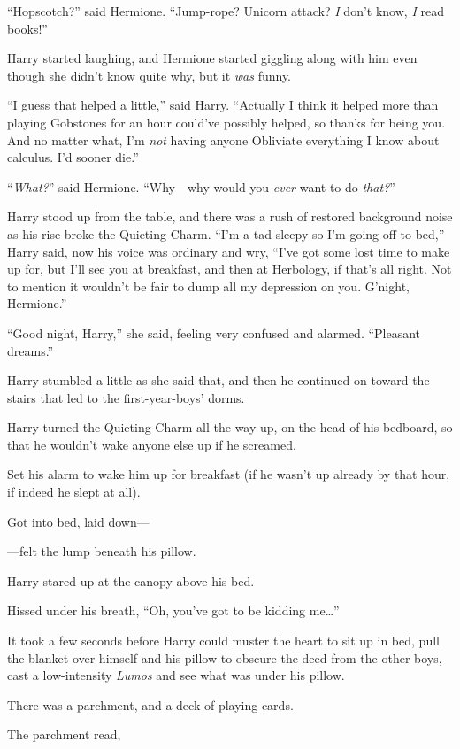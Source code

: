 “Hopscotch?” said Hermione. “Jump-rope? Unicorn attack? \emph{I} don’t know, \emph{I} read books!”

Harry started laughing, and Hermione started giggling along with him even though she didn’t know quite why, but it \emph{was} funny.

“I guess that helped a little,” said Harry. “Actually I think it helped more than playing Gobstones for an hour could’ve possibly helped, so thanks for being you. And no matter what, I’m \emph{not} having anyone Obliviate everything I know about calculus. I’d sooner die.”

“\emph{What?}” said Hermione. “Why—why would you \emph{ever} want to do \emph{that?}”

Harry stood up from the table, and there was a rush of restored background noise as his rise broke the Quieting Charm. “I’m a tad sleepy so I’m going off to bed,” Harry said, now his voice was ordinary and wry, “I’ve got some lost time to make up for, but I’ll see you at breakfast, and then at Herbology, if that’s all right. Not to mention it wouldn’t be fair to dump all my depression on you. G’night, Hermione.”

“Good night, Harry,” she said, feeling very confused and alarmed. “Pleasant dreams.”

Harry stumbled a little as she said that, and then he continued on toward the stairs that led to the first-year-boys’ dorms.

\later

Harry turned the Quieting Charm all the way up, on the head of his bedboard, so that he wouldn’t wake anyone else up if he screamed.

Set his alarm to wake him up for breakfast (if he wasn’t up already by that hour, if indeed he slept at all).

Got into bed, laid down—

—felt the lump beneath his pillow.

Harry stared up at the canopy above his bed.

Hissed under his breath, “Oh, you’ve got to be kidding me…”

It took a few seconds before Harry could muster the heart to sit up in bed, pull the blanket over himself and his pillow to obscure the deed from the other boys, cast a low-intensity \emph{Lumos} and see what was under his pillow.

There was a parchment, and a deck of playing cards.

The parchment read,

